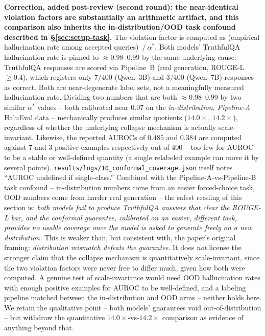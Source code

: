 \documentclass[10pt,twocolumn]{article}
\begin{document}
\textbf{Correction, added post-review (second round): the near-identical
violation factors are substantially an arithmetic artifact, and this
comparison also inherits the in-distribution/OOD task confound described
in \S\ref{sec:setup-task}.} The violation factor is computed as
(empirical hallucination rate among accepted queries)~$/~\alpha^*$. Both
models' TruthfulQA hallucination rate is pinned to ${\approx}0.98$--$0.99$
by the same underlying cause: TruthfulQA responses are scored via
Pipeline~B (real generation, ROUGE-L~$\geq 0.4$), which registers only
$7/400$ (Qwen~3B) and $3/400$ (Qwen~7B) responses as correct. Both are
near-degenerate label sets, not a meaningfully measured hallucination
rate. Dividing two numbers that are both ${\approx}0.98$--$0.99$ by two
similar $\alpha^*$ values -- both calibrated near $0.07$ on the
\emph{in-distribution, Pipeline-A} HaluEval data -- mechanically
produces similar quotients ($14.0\times$, $14.2\times$), regardless of
whether the underlying collapse mechanism is actually scale-invariant.
Likewise, the reported AUROCs of $0.485$ and $0.384$ are computed
against $7$ and $3$ positive examples respectively out of $400$ -- too
few for AUROC to be a stable or well-defined quantity (a single
relabeled example can move it by several points).
\texttt{results/logs/10\_conformal\_coverage.json} itself notes ``AUROC
undefined if single-class.'' Combined with the Pipeline-A-vs-Pipeline-B
task confound -- in-distribution numbers come from an easier
forced-choice task, OOD numbers come from harder real generation -- the
safest reading of this section is: \emph{both models fail to produce
TruthfulQA answers that clear the ROUGE-L bar, and the conformal
guarantee, calibrated on an easier, different task, provides no usable
coverage once the model is asked to generate freely on a new
distribution.} This is weaker than, but consistent with, the paper's
original framing: \emph{distribution mismatch defeats the guarantee}. It
does \emph{not} license the stronger claim that the collapse mechanism
is quantitatively scale-invariant, since the two violation factors were
never free to differ much, given how both were computed. A genuine test
of scale-invariance would need OOD hallucination rates with enough
positive examples for AUROC to be well-defined, and a labeling pipeline
matched between the in-distribution and OOD arms -- neither holds here.
We retain the qualitative point -- both models' guarantees void
out-of-distribution -- but withdraw the quantitative
$14.0\times$-vs-$14.2\times$ comparison as evidence of anything beyond
that.
\end{document}
